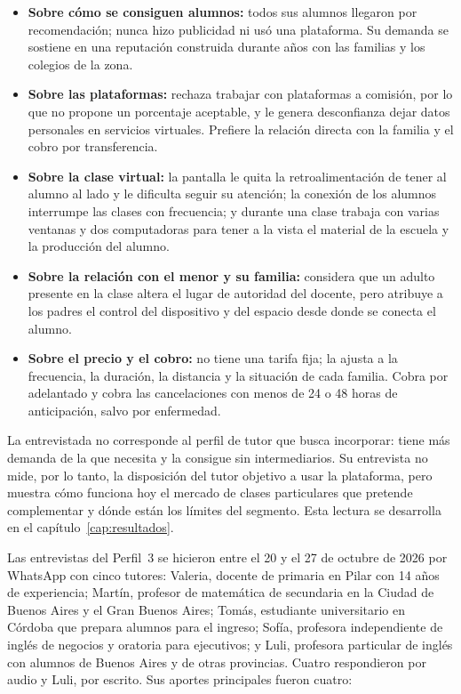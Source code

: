 \begin{itemize}
    \item \textbf{Sobre cómo se consiguen alumnos:} todos sus alumnos
          llegaron por recomendación; nunca hizo publicidad ni usó una
          plataforma. Su demanda se sostiene en una reputación construida
          durante años con las familias y los colegios de la zona.
    \item \textbf{Sobre las plataformas:} rechaza trabajar con
          plataformas a comisión, por lo que no propone un porcentaje
          aceptable, y le genera desconfianza dejar datos personales en
          servicios virtuales. Prefiere la relación directa con la familia
          y el cobro por transferencia.
    \item \textbf{Sobre la clase virtual:} la pantalla le quita la
          retroalimentación de tener al alumno al lado y le dificulta
          seguir su atención; la conexión de los alumnos interrumpe las
          clases con frecuencia; y durante una clase trabaja con varias
          ventanas y dos computadoras para tener a la vista el material de
          la escuela y la producción del alumno.
    \item \textbf{Sobre la relación con el menor y su familia:} considera
          que un adulto presente en la clase altera el lugar de autoridad
          del docente, pero atribuye a los padres el control del
          dispositivo y del espacio desde donde se conecta el alumno.
    \item \textbf{Sobre el precio y el cobro:} no tiene una tarifa fija;
          la ajusta a la frecuencia, la duración, la distancia y la
          situación de cada familia. Cobra por adelantado y cobra las
          cancelaciones con menos de 24 o 48 horas de anticipación, salvo
          por enfermedad.
\end{itemize}

La entrevistada no corresponde al perfil de tutor que \sistema{} busca
incorporar: tiene más demanda de la que necesita y la consigue sin
intermediarios. Su entrevista no mide, por lo tanto, la disposición del
tutor objetivo a usar la plataforma, pero muestra cómo funciona hoy el
mercado de clases particulares que \sistema{} pretende complementar y
dónde están los límites del segmento. Esta lectura se desarrolla en el
capítulo~\ref{cap:resultados}.

Las entrevistas del Perfil~3 se hicieron entre el 20 y el 27 de octubre de 2026 por WhatsApp
con cinco tutores: Valeria, docente de primaria en Pilar con 14
años de experiencia; Martín, profesor de matemática de secundaria en la
Ciudad de Buenos Aires y el Gran Buenos Aires; Tomás, estudiante
universitario en Córdoba que prepara alumnos para el ingreso; Sofía,
profesora independiente de inglés de negocios y oratoria para ejecutivos;
y Luli, profesora particular de inglés con alumnos de Buenos Aires y de
otras provincias. Cuatro respondieron por audio y Luli, por escrito.
Sus aportes principales fueron cuatro:

